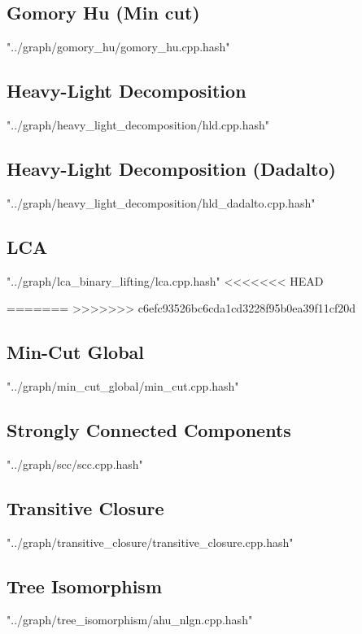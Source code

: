\documentclass [a4paper,5pt,oneside, landscape]{article}
\begin{document}
\begin{multicols}{3}
\subsection{ Gomory Hu (Min cut)}
 {"../graph/gomory_hu/gomory_hu.cpp.hash"}


\subsection{ Heavy-Light Decomposition}
 {"../graph/heavy_light_decomposition/hld.cpp.hash"}


\subsection{ Heavy-Light Decomposition (Dadalto)}
 {"../graph/heavy_light_decomposition/hld_dadalto.cpp.hash"}


\subsection{ LCA}
 {"../graph/lca_binary_lifting/lca.cpp.hash"}
<<<<<<< HEAD

=======
\newpage
>>>>>>> c6efc93526bc6cda1cd3228f95b0ea39f11cf20d

\subsection{ Min-Cut Global}
 {"../graph/min_cut_global/min_cut.cpp.hash"}


\subsection{ Strongly Connected Components}
 {"../graph/scc/scc.cpp.hash"}


\subsection{ Transitive Closure}
 {"../graph/transitive_closure/transitive_closure.cpp.hash"}


\subsection{ Tree Isomorphism}
 {"../graph/tree_isomorphism/ahu_nlgn.cpp.hash"}




\end{multicols}
\end{document}
